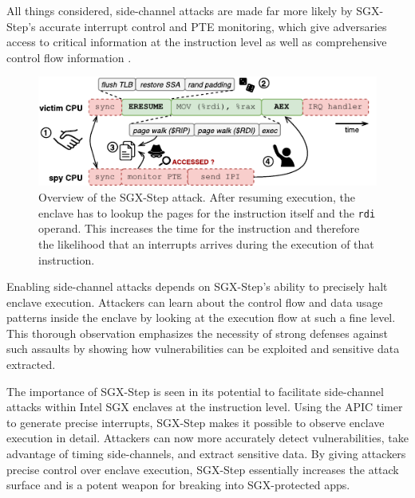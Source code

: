 \documentclass{llncs}
\begin{document}
All things considered, side-channel attacks are made far more likely by SGX-Step's accurate interrupt control and PTE monitoring, which give adversaries access to critical information at the instruction level as well as comprehensive control flow information \cite{BulckPS17}.

\begin{figure}[t]
  \centering
  \includegraphics{images/sgx-step-pte.pdf}
  \caption{Overview of the SGX-Step attack.
    After resuming execution, the enclave has to lookup the pages for
    the instruction itself and the \texttt{rdi} operand. This increases the time
    for the instruction and therefore the likelihood that an interrupts arrives
    during the execution of that instruction.}
  \label{fig:sgx-step-pte}
\end{figure}

Enabling side-channel attacks depends on SGX-Step's ability to precisely halt enclave execution. Attackers can learn about the control flow and data usage patterns inside the enclave by looking at the execution flow at such a fine level. This thorough observation emphasizes the necessity of strong defenses against such assaults by showing how vulnerabilities can be exploited and sensitive data extracted.

The importance of SGX-Step is seen in its potential to facilitate side-channel attacks within Intel SGX enclaves at the instruction level. Using the APIC timer to generate precise interrupts, SGX-Step makes it possible to observe enclave execution in detail. Attackers can now more accurately detect vulnerabilities, take advantage of timing side-channels, and extract sensitive data. By giving attackers precise control over enclave execution, SGX-Step essentially increases the attack surface and is a potent weapon for breaking into SGX-protected apps.
\end{document}

